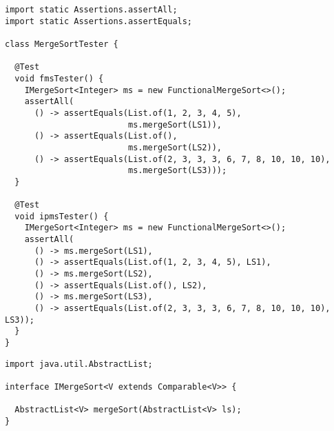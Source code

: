 \begin{lstlisting}[language=MyJava]
import static Assertions.assertAll;
import static Assertions.assertEquals;

class MergeSortTester {

  @Test
  void fmsTester() {
    IMergeSort<Integer> ms = new FunctionalMergeSort<>();
    assertAll(
      () -> assertEquals(List.of(1, 2, 3, 4, 5), 
                         ms.mergeSort(LS1)),
      () -> assertEquals(List.of(), 
                         ms.mergeSort(LS2)),
      () -> assertEquals(List.of(2, 3, 3, 3, 6, 7, 8, 10, 10, 10), 
                         ms.mergeSort(LS3)));
  }

  @Test
  void ipmsTester() {
    IMergeSort<Integer> ms = new FunctionalMergeSort<>();
    assertAll(
      () -> ms.mergeSort(LS1),
      () -> assertEquals(List.of(1, 2, 3, 4, 5), LS1),
      () -> ms.mergeSort(LS2),
      () -> assertEquals(List.of(), LS2),
      () -> ms.mergeSort(LS3),
      () -> assertEquals(List.of(2, 3, 3, 3, 6, 7, 8, 10, 10, 10), LS3));
  }
}
\end{lstlisting}
  
\begin{lstlisting}[language=MyJava]
import java.util.AbstractList;

interface IMergeSort<V extends Comparable<V>> {

  AbstractList<V> mergeSort(AbstractList<V> ls);
}
\end{lstlisting}

\newpage %
\enlargethispage{1\baselineskip}
